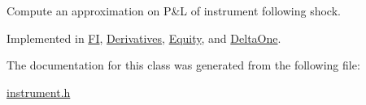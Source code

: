 Compute an approximation on P\&L of instrument following shock. 



Implemented in \hyperlink{classFI_a99ad4380e8178d7fd304597622a2c05c}{FI}, \hyperlink{classDerivatives_a765ecae139ee81fb5143a20462211623}{Derivatives}, \hyperlink{classEquity_a2844b7fa3dd164ce216909d1fe958c9f}{Equity}, and \hyperlink{classDeltaOne_a8dd4b5243412ab399b07c1128262f570}{Delta\+One}.



The documentation for this class was generated from the following file\+:\begin{DoxyCompactItemize}
\item 
\hyperlink{instrument_8h}{instrument.\+h}\end{DoxyCompactItemize}
